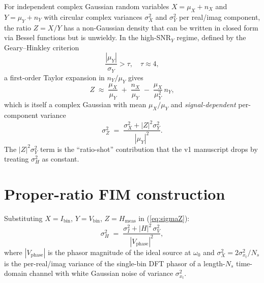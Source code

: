 \documentclass[11pt,a4paper]{article}
\begin{document}
For independent complex Gaussian random variables
$X = \mu_X + n_X$ and $Y = \mu_Y + n_Y$ with circular complex
variances $\sigma_X^2$ and $\sigma_Y^2$ per real/imag component,
the ratio $Z = X/Y$ has a non-Gaussian density
\cite{Marsaglia1965Ratio,NadarajahPogany2018} that can be written
in closed form via Bessel functions but is unwieldy.  In the
high-SNR$_Y$ regime, defined by the Geary--Hinkley criterion
\begin{equation}
   \frac{|\mu_Y|}{\sigma_Y} > \tau, \quad \tau \approx 4,
   \label{eq:gh}
\end{equation}
a first-order Taylor expansion in $n_Y/\mu_Y$ gives
\begin{equation}
   Z \;\approx\; \frac{\mu_X}{\mu_Y}
                 \;+\; \frac{n_X}{\mu_Y}
                 \;-\; \frac{\mu_X}{\mu_Y^2}\,n_Y,
   \label{eq:taylor}
\end{equation}
which is itself a complex Gaussian with mean $\mu_X/\mu_Y$ and
\emph{signal-dependent} per-component variance
\begin{equation}
   \sigma_Z^2 \;=\; \frac{\sigma_X^2 + |Z|^2 \sigma_Y^2}{|\mu_Y|^2}.
   \label{eq:sigmaZ}
\end{equation}
The $|Z|^2 \sigma_Y^2$ term is the ``ratio-shot'' contribution that
the v1 manuscript drops by treating $\sigma_H^2$ as constant.

\section{Proper-ratio FIM construction}

Substituting $X = I_{\mathrm{bin}}$, $Y = V_{\mathrm{bin}}$,
$Z = H_{\mathrm{meas}}$ in (\ref{eq:sigmaZ}):
\begin{equation}
   \sigma_H^2 \;=\;
       \frac{\sigma_I^2 + |H|^2\,\sigma_V^2}{|V_{\mathrm{phase}}|^2},
   \label{eq:sigmaH}
\end{equation}
where $|V_{\mathrm{phase}}|$ is the phasor magnitude of the
ideal source at $\omega_0$ and $\sigma_X^2 = 2\sigma_{x_t}^2 / N_s$
is the per-real/imag variance of the single-bin DFT phasor of a
length-$N_s$ time-domain channel with white Gaussian noise of
variance $\sigma_{x_t}^2$.
\end{document}
